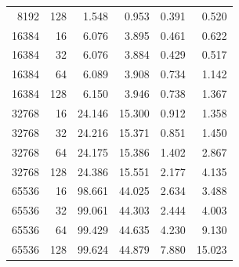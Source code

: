 \documentclass[11pt]{article}
\begin{document}
\begin{table}[H]
\begin{tabular}{rrrrrr}
8192 & 128 & 1.548 & 0.953 & 0.391 & 0.520 \\
16384 & 16 & 6.076 & 3.895 & 0.461 & 0.622 \\
16384 & 32 & 6.076 & 3.884 & 0.429 & 0.517 \\
16384 & 64 & 6.089 & 3.908 & 0.734 & 1.142 \\
16384 & 128 & 6.150 & 3.946 & 0.738 & 1.367 \\
32768 & 16 & 24.146 & 15.300 & 0.912 & 1.358 \\
32768 & 32 & 24.216 & 15.371 & 0.851 & 1.450 \\
32768 & 64 & 24.175 & 15.386 & 1.402 & 2.867 \\
32768 & 128 & 24.386 & 15.551 & 2.177 & 4.135 \\
65536 & 16 & 98.661 & 44.025 & 2.634 & 3.488 \\
65536 & 32 & 99.061 & 44.303 & 2.444 & 4.003 \\
65536 & 64 & 99.429 & 44.635 & 4.230 & 9.130 \\
65536 & 128 & 99.624 & 44.879 & 7.880 & 15.023 \\
\bottomrule
\end{tabular}
\end{table}
\end{document}
